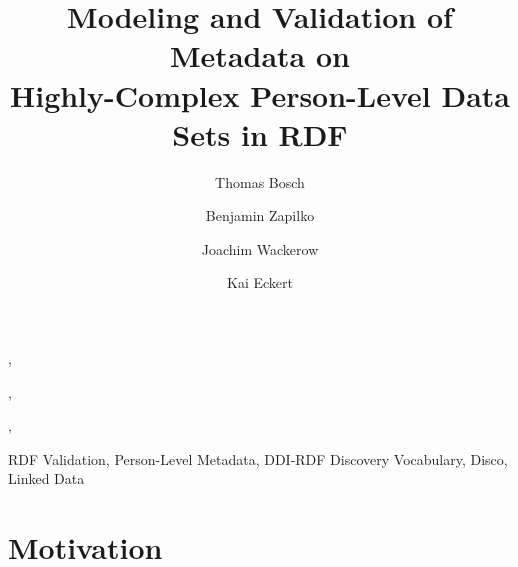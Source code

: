 \documentclass{elsart3p}    %
\begin{document}
\begin{frontmatter}


\title{Modeling and Validation of Metadata on \\ Highly-Complex Person-Level Data Sets in RDF}


\author[gesis]{Thomas Bosch},
\author[gesis]{Benjamin Zapilko},
\author[gesis]{Joachim Wackerow}
,
\author[mannheim]{Kai Eckert}



\medskip


\address[gesis]{Gesis - Leibniz Institute for the Social Sciences, 68159 Mannheim, Germany}
\address[mannheim]{University of Mannheim, 68159 Mannheim, Germany}

\begin{abstract} 



\end{abstract}


\begin{keyword}
 RDF Validation, Person-Level Metadata, DDI-RDF Discovery Vocabulary, Disco, Linked Data
\end{keyword}

\end{frontmatter}


\section{Motivation}
\end{document}
